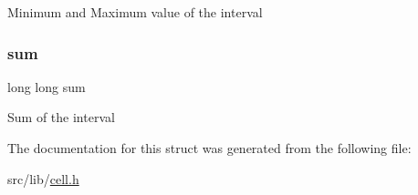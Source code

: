 Minimum and Maximum value of the interval \mbox{\label{structcell_a59baa572a76668b247ced468c54d047d}} 
\subsubsection{\texorpdfstring{sum}{sum}}
{\footnotesize\ttfamily long long sum}

Sum of the interval 

The documentation for this struct was generated from the following file\+:\begin{DoxyCompactItemize}
\item 
src/lib/\hyperlink{cell_8h}{cell.\+h}\end{DoxyCompactItemize}
